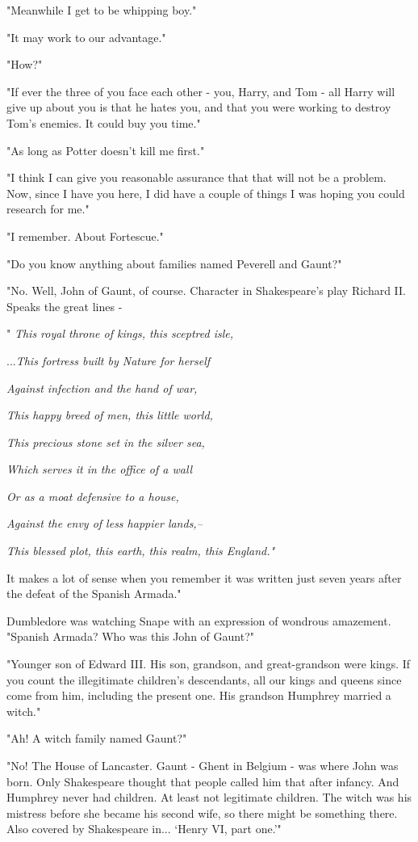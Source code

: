 \documentclass[a4paper,11pt]{article}
\begin{document}
"Meanwhile I get to be whipping boy."

"It may work to our advantage."

"How?"

"If ever the three of you face each other - you, Harry, and Tom - all Harry will give up about you is that he hates you, and that you were working to destroy Tom's enemies. It could buy you time."

"As long as Potter doesn't kill me first."

"I think I can give you reasonable assurance that that will not be a problem. Now, since I have you here, I did have a couple of things I was hoping you could research for me."

"I remember. About Fortescue."

"Do you know anything about families named Peverell and Gaunt?"

"No. Well, John of Gaunt, of course. Character in Shakespeare's play Richard II. Speaks the great lines -

" \emph{This royal throne of kings, this sceptred isle,}

...\emph{This fortress built by Nature for herself}

\emph{Against infection and the hand of war,}

\emph{This happy breed of men, this little world,}

\emph{This precious stone set in the silver sea,}

\emph{Which serves it in the office of a wall}

\emph{Or as a moat defensive to a house,}

\emph{Against the envy of less happier lands,--}

\emph{This blessed plot, this earth, this realm, this England."}

It makes a lot of sense when you remember it was written just seven years after the defeat of the Spanish Armada."

Dumbledore was watching Snape with an expression of wondrous amazement. "Spanish Armada? Who was this John of Gaunt?"

"Younger son of Edward III. His son, grandson, and great-grandson were kings. If you count the illegitimate children's descendants, all our kings and queens since come from him, including the present one. His grandson Humphrey married a witch."

"Ah! A witch family named Gaunt?"

"No! The House of Lancaster. Gaunt - Ghent in Belgium - was where John was born. Only Shakespeare thought that people called him that after infancy. And Humphrey never had children. At least not legitimate children. The witch was his mistress before she became his second wife, so there might be something there. Also covered by Shakespeare in... `Henry VI, part one.'"
\end{document}
